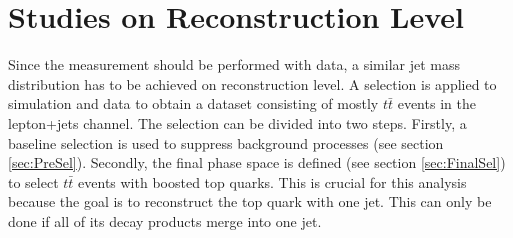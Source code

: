 \section{Studies on Reconstruction Level}
\label{sec:selection}
	Since the measurement should be performed with data, a similar jet mass distribution has to be achieved on reconstruction level. A selection is applied to simulation and data to obtain a dataset consisting of mostly $t\bar{t}$ events in the lepton+jets channel. The selection can be divided into two steps. Firstly, a baseline selection is used to suppress background processes (see section \ref{sec:PreSel}). Secondly, the final phase space is defined (see section \ref{sec:FinalSel}) to select $t\bar{t}$ events with boosted top quarks. This is crucial for this analysis because the goal is to reconstruct the top quark with one jet. This can only be done if all of its decay products merge into one jet.

